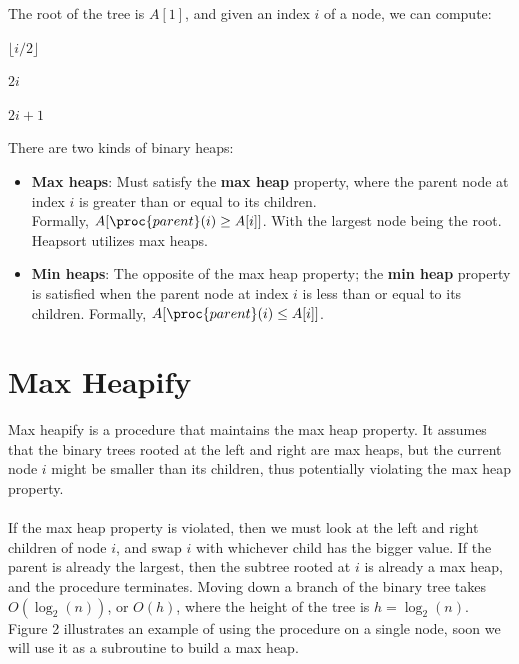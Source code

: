\documentclass{article}
\begin{document}
The root of the tree is $A[1]$, and given an index $i$ of a node, we can compute:
\begin{codebox}
\li \Return $\lfloor i/2 \rfloor$
\end{codebox}

\begin{codebox}
\li \Return $2i$
\end{codebox}

\begin{codebox}
\li \Return $2i + 1$
\end{codebox}

There are two kinds of binary heaps:
\begin{itemize}
    \item \textbf{Max heaps}: Must satisfy the \textbf{max heap} property, where the parent node at index $i$ is greater than or equal to its children. \\Formally, $A[\proc{parent}(i) \geq A[i]]$. With the largest node being the root. Heapsort utilizes max heaps.
    \\
    \item \textbf{Min heaps}: The opposite of the max heap property; the \textbf{min heap} property is satisfied when the parent node at index $i$ is less than or equal to its children. Formally, $A[\proc{parent}(i) \leq A[i]]$.
\end{itemize}

\section*{Max Heapify}
Max heapify is a procedure that maintains the max heap property. It assumes that the binary trees rooted at the left and right are max heaps, but the current node $i$ might be smaller than its children, thus potentially violating the max heap property.
\\ \\
If the max heap property is violated, then we must look at the left and right children of node $i$, and swap $i$ with whichever child has the bigger value. If the parent is already the largest, then the subtree rooted at $i$ is already a max heap, and the procedure terminates. Moving down a branch of the binary tree takes $O(\log_2{(n)})$, or $O(h)$, where the height of the tree is $ h = \log_2{(n)}$. Figure 2 illustrates an example of using the procedure on a single node, soon we will use it as a subroutine to build a max heap.
\end{document}
